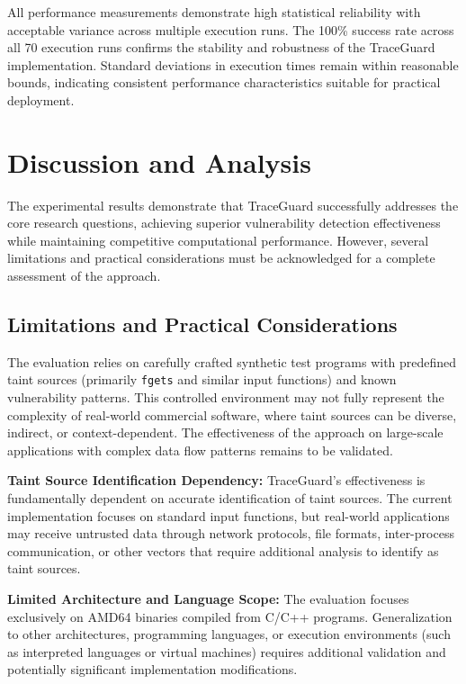 All performance measurements demonstrate high statistical reliability with acceptable variance across multiple execution runs. The 100\% success rate across all 70 execution runs confirms the stability and robustness of the TraceGuard implementation. Standard deviations in execution times remain within reasonable bounds, indicating consistent performance characteristics suitable for practical deployment.

\section{Discussion and Analysis}

The experimental results demonstrate that TraceGuard successfully addresses the core research questions, achieving superior vulnerability detection effectiveness while maintaining competitive computational performance. However, several limitations and practical considerations must be acknowledged for a complete assessment of the approach.

\subsection{Limitations and Practical Considerations} The evaluation relies on carefully crafted synthetic test programs with predefined taint sources (primarily \texttt{fgets} and similar input functions) and known vulnerability patterns. This controlled environment may not fully represent the complexity of real-world commercial software, where taint sources can be diverse, indirect, or context-dependent. The effectiveness of the approach on large-scale applications with complex data flow patterns remains to be validated.

\textbf{Taint Source Identification Dependency:} TraceGuard's effectiveness is fundamentally dependent on accurate identification of taint sources. The current implementation focuses on standard input functions, but real-world applications may receive untrusted data through network protocols, file formats, inter-process communication, or other vectors that require additional analysis to identify as taint sources.

\textbf{Limited Architecture and Language Scope:} The evaluation focuses exclusively on AMD64 binaries compiled from C/C++ programs. Generalization to other architectures, programming languages, or execution environments (such as interpreted languages or virtual machines) requires additional validation and potentially significant implementation modifications.

